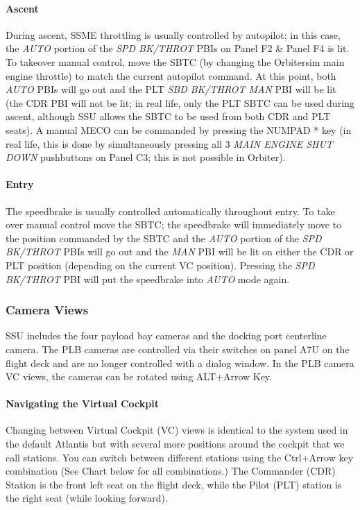 \documentclass[13pt]{article}
\begin{document}
\begin{multicols*}{2}
\paragraph{Ascent}
During ascent, SSME throttling is usually controlled by autopilot; in this case, the \textit{AUTO} portion of the \textit{SPD BK/THROT} PBIs on Panel F2 \& Panel F4 is lit. To takeover manual control, move the SBTC (by changing the Orbitersim main engine throttle) to match the current autopilot command. At this point, both \textit{AUTO} PBIs will go out and the PLT \textit{SBD BK/THROT MAN} PBI will be lit (the CDR PBI will not be lit; in real life, only the PLT SBTC can be used during ascent, although SSU allows the SBTC to be used from both CDR and PLT seats). A manual MECO can be commanded by pressing the NUMPAD * key (in real life, this is done by simultaneously pressing all 3 \textit{MAIN ENGINE SHUT DOWN} pushbuttons on Panel C3; this is not possible in Orbiter).

\paragraph{Entry}
\label{sec:entry}
The speedbrake is usually controlled automatically throughout entry. To take over manual control move the SBTC; the speedbrake will immediately move to the position commanded by the SBTC and the \textit{AUTO} portion of the \textit{SPD BK/THROT} PBIs will go out and the \textit{MAN} PBI will be lit on either the CDR or PLT position (depending on the current VC position). Pressing the \textit{SPD BK/THROT} PBI will put the speedbrake into \textit{AUTO} mode again.


\subsubsection{Camera Views}
SSU includes the four payload bay cameras and the docking port centerline camera. The PLB cameras are controlled via their switches on panel A7U on the flight deck and are no longer controlled with a dialog window. In the PLB camera VC views, the cameras can be rotated using ALT+Arrow Key.

\paragraph{Navigating the Virtual Cockpit}
Changing between Virtual Cockpit (VC) views is identical to the system used in the default Atlantis but with several more positions around the cockpit that we call stations. You can switch between different stations using the Ctrl+Arrow key combination (See Chart below for all combinations.) The Commander (CDR) Station is the front left seat on the flight deck, while the Pilot (PLT) station is the right seat (while looking forward).\\


\end{multicols*}
\end{document}
